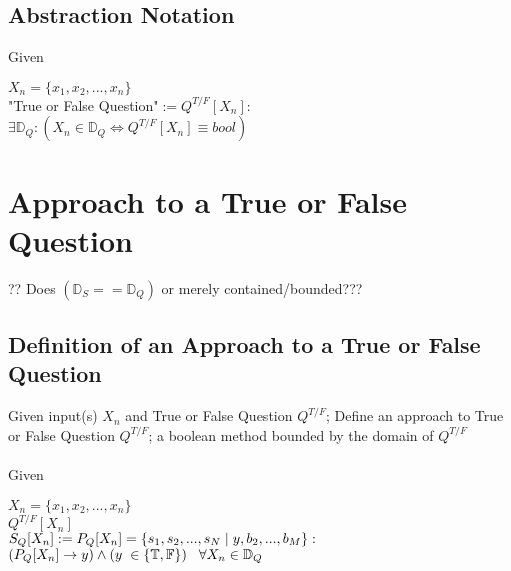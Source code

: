 \documentclass[11pt]{article}
\begin{document}
\subsection{Abstraction Notation}
\vspace{1mm}
Given
\begin{center}
$
X_n = \{x_1,x_2,...,x_n\}
$
\\ \vspace{6mm}
"True or False Question"$ := Q^{T/F}[X_n]:
$
\\ \vspace{4mm}
$
\exists \mathbb{D}_Q : (X_n \in \mathbb{D}_Q \Leftrightarrow Q^{T/F}[X_n] \equiv bool) 
$
\end{center}
\vspace{.1mm}





\newpage

\section{Approach to a True or False Question}
?? Does $(\mathbb{D}_S == \mathbb{D}_Q)$ or merely contained/bounded???
\subsection{Definition of an Approach to a True or False Question}
Given input(s) $X_n$ and True or False Question $Q^{T/F}$; Define an approach to True or False Question $Q^{T/F}$;
a boolean method bounded by the domain of $Q^{T/F}$\\
\\
Given
\begin{center}
$
X_n = \{x_1,x_2,...,x_n\}
$
\\ \vspace{2mm}
$
Q^{T/F}[X_n]
$
\\ \vspace{6mm}
$
S_{Q}[X_n] := P_{Q}[X_n] =\{ s_1,s_2,...,s_{N}\hspace{1mm}|\hspace{1mm} y, b_2,...,b_M\} :
$
\\ \vspace{2mm}
$
(P_{Q}[X_n] \rightarrow y) \land(y \hspace{1mm} \in  \{\mathbb{T},\mathbb{F}\}) \hspace{3mm} \forall X_n \in \mathbb{D}_Q
$
\end{center}
\end{document}
